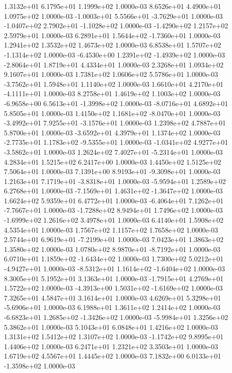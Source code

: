 1.3132e+01 6.1795e+01 1.1999e+02  1.0000e-03
8.6526e+01 4.4900e+01 1.0975e+02  1.0000e-03
-1.0003e+01  5.5566e+01 -3.7629e+01  1.0000e-03
-1.0407e+02  2.7902e+01 -1.1028e+02  1.0000e-03
-1.4290e+02  1.2157e+02  2.5979e+01  1.0000e-03
 6.2891e+01  1.5644e+02 -1.7360e+01  1.0000e-03
1.2941e+02 1.3532e+02 1.4673e+02  1.0000e-03
 6.8538e+01  1.5707e+02 -1.1314e+02  1.0000e-03
-6.4530e+00  1.2391e+02 -1.4939e+02  1.0000e-03
-2.8064e+01  1.8719e+01  4.4334e+01  1.0000e-03
2.3268e+01 1.0934e+02 9.1607e+01  1.0000e-03
1.7381e+02 1.0606e+02 5.5786e+01  1.0000e-03
-3.7562e+01  1.5948e+01  1.1140e+02  1.0000e-03
 1.6610e+01  4.2170e+01 -4.1111e+01  1.0000e-03
8.2758e+01 1.4619e+02 1.1003e+02  1.0000e-03
-6.9658e+00  6.5613e+01 -1.3998e+02  1.0000e-03
-8.0716e+01  4.6892e+01  5.8505e+01  1.0000e-03
 1.4150e+02  1.1681e+02 -8.0470e+01  1.0000e-03
-3.4992e+01  7.9255e+01 -3.1576e+01  1.0000e-03
1.2398e+02 4.7887e+01 5.8700e+01  1.0000e-03
-3.6592e+01  4.3979e+01  1.1374e+02  1.0000e-03
-2.7735e+01  1.1783e+02 -9.5355e+01  1.0000e-03
-1.0341e+02  4.9277e+01 -3.5862e+01  1.0000e-03
 1.2624e+02  7.4027e+01 -5.2314e+01  1.0000e-03
4.2834e+01 1.5215e+02 6.2417e+00  1.0000e-03
1.4450e+02 1.5125e+02 7.5064e+01  1.0000e-03
 7.1391e+00  8.9193e+01 -9.3098e+01  1.0000e-03
 1.2163e+01  7.1719e+01 -3.8318e+01  1.0000e-03
-5.9594e+01  1.2589e+02  6.2768e+01  1.0000e-03
-7.1569e+01  1.4631e+02 -1.3647e+02  1.0000e-03
1.6624e+02 5.9359e+01 6.4772e+01  1.0000e-03
-6.4064e+01  7.1262e+01 -7.7667e+01  1.0000e-03
-1.7288e+02  8.9494e+01  1.7496e+02  1.0000e-03
-1.6999e+02  1.2616e+02  3.4978e+01  1.0000e-03
6.4140e+01 1.5908e+02 4.5354e+01  1.0000e-03
1.7567e+02 1.1157e+02 1.7658e+02  1.0000e-03
 2.5744e+01  6.9619e+01 -7.2199e+01  1.0000e-03
7.0423e+01 1.3863e+02 1.3580e+02  1.0000e-03
 1.0780e+02  8.9870e+01 -8.7192e+01  1.0000e-03
 6.0710e+01  1.1859e+02 -1.6434e+02  1.0000e-03
 1.7300e+02  5.0212e+01 -4.9427e+01  1.0000e-03
-8.5312e+01  1.1614e+02 -1.6404e+02  1.0000e-03
8.3005e+01 5.1952e+01 3.1363e+01  1.0000e-03
-1.7915e+01  4.2769e+01  1.5722e+02  1.0000e-03
-4.3913e+00  1.5031e+02 -1.6169e+02  1.0000e-03
7.3265e+01 4.5847e+01 3.1614e+01  1.0000e-03
 4.6269e+01  5.3298e+01 -5.6906e+01  1.0000e-03
6.1988e+01 1.3611e+02 1.2414e+02  1.0000e-03
-6.6823e+01  1.2685e+02 -1.3426e+02  1.0000e-03
-5.9984e+01  1.3256e+02  5.3862e+01  1.0000e-03
5.1043e+01 6.0848e+01 1.4216e+02  1.0000e-03
1.3131e+02 1.5412e+02 1.3107e+02  1.0000e-03
-1.1742e+02  9.8995e+01  1.4406e+02  1.0000e-03
6.2471e+01 1.2321e+02 3.3503e+01  1.0000e-03
1.6719e+02 4.5567e+01 1.4445e+02  1.0000e-03
 7.1832e+00  6.0133e+01 -1.3598e+02  1.0000e-03
